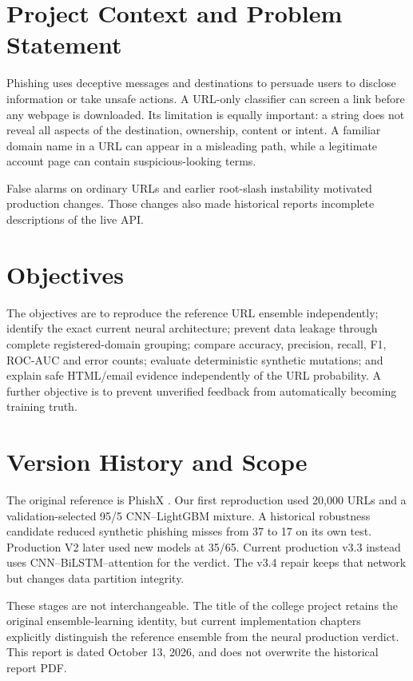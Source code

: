 \section{Project Context and Problem Statement}
Phishing uses deceptive messages and destinations to persuade users to disclose information or take unsafe actions. A URL-only classifier can screen a link before any webpage is downloaded. Its limitation is equally important: a string does not reveal all aspects of the destination, ownership, content or intent. A familiar domain name in a URL can appear in a misleading path, while a legitimate account page can contain suspicious-looking terms.

False alarms on ordinary URLs and earlier root-slash instability motivated production changes. Those changes also made historical reports incomplete descriptions of the live API.

\section{Objectives}
The objectives are to reproduce the reference URL ensemble independently; identify the exact current neural architecture; prevent data leakage through complete registered-domain grouping; compare accuracy, precision, recall, F1, ROC-AUC and error counts; evaluate deterministic synthetic mutations; and explain safe HTML/email evidence independently of the URL probability. A further objective is to prevent unverified feedback from automatically becoming training truth.

\section{Version History and Scope}
The original reference is PhishX \cite{dubey2025phishx}. Our first reproduction used 20,000 URLs and a validation-selected 95/5 CNN--LightGBM mixture. A historical robustness candidate reduced synthetic phishing misses from 37 to 17 on its own test. Production V2 later used new models at 35/65. Current production v3.3 instead uses CNN--BiLSTM--attention for the verdict. The v3.4 repair keeps that network but changes data partition integrity.

These stages are not interchangeable. The title of the college project retains the original ensemble-learning identity, but current implementation chapters explicitly distinguish the reference ensemble from the neural production verdict. This report is dated October 13, 2026, and does not overwrite the historical report PDF.

